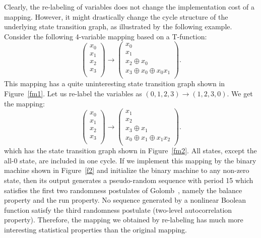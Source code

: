 \documentclass[9pt,conference]{IEEEtran} \usepackage{times}
\begin{document}
Clearly, the re-labeling of variables does not change the implementation cost of a mapping.
However, it might drastically change the cycle structure of the underlying 
state transition graph, as illustrated by the following example. 
Consider the following 4-variable mapping based on a T-function:
\begin{equation} \label{m1}
\left(
\begin{array}{c}
x_0\\
x_1\\
x_2\\
x_3\\
\end{array}
\right)
\rightarrow
\left(
\begin{array}{c}
x_0\\
x_1\\
x_2 \oplus x_0\\
x_3 \oplus x_0 \oplus x_0 x_1\\
\end{array}
\right).
\end{equation}
This mapping has a quite uninteresting state transition graph shown in Figure~\ref{fm1}.
Let us re-label the variables as $(0,1,2,3) \rightarrow (1,2,3,0)$. We get the mapping:
\begin{equation} \label{m2}
\left(
\begin{array}{c}
x_0\\
x_1\\
x_2\\
x_3\\
\end{array}
\right)
\rightarrow
\left(
\begin{array}{c}
x_1\\
x_2\\
x_3 \oplus x_1\\
x_0 \oplus x_1 \oplus x_1 x_2\\
\end{array}
\right).
\end{equation}
which has the state transition graph shown in Figure~\ref{fm2}. All states, except the all-0 state, are included in one cycle. If we implement this mapping by the binary machine shown in Figure~\ref{f2} and initialize the binary machine to any non-zero state, then its output generates a pseudo-random sequence with period 15 which 
satisfies the first two randomness postulates of Golomb~\cite{Golomb_book}, namely the balance property and the run property. 
No sequence generated by a nonlinear Boolean function satisfy the third randomness postulate (two-level autocorrelation property). 
Therefore, the mapping we obtained by re-labeling has much more interesting statistical properties than the original mapping. 
\end{document}
